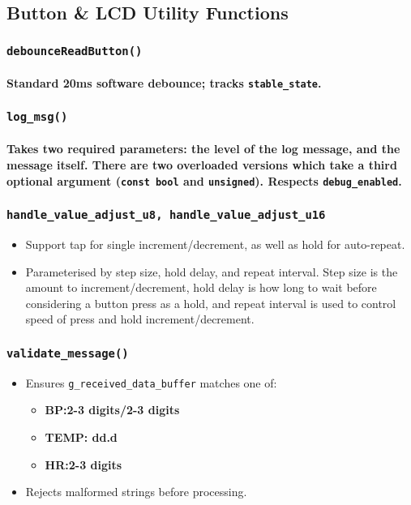 \subsection{Button \& LCD Utility Functions}
\subsubsection{\lstinline|debounceReadButton()|}
\paragraph{Standard 20ms software debounce; tracks \lstinline|stable_state|.}
\subsubsection{\lstinline|log_msg()|}
\paragraph{Takes two required parameters: the level of the log message, and the message itself. There are two overloaded versions which take a third optional argument (\lstinline|const bool| and \lstinline|unsigned|). Respects \lstinline|debug_enabled|.}
\subsubsection{\lstinline|handle_value_adjust_u8, handle_value_adjust_u16|}
\begin{itemize}
	\item Support tap for single increment/decrement, as well as hold for auto-repeat.
	\item Parameterised by step size, hold delay, and repeat interval. Step size is the amount to increment/decrement, hold delay is how long to wait before considering a button press as a hold, and repeat interval is used to control speed of press and hold increment/decrement.
	
\end{itemize}
\subsubsection{\lstinline|validate_message()|}
\begin{itemize}
	\item Ensures \lstinline|g_received_data_buffer| matches one of:
	\begin{itemize}
		\item \textbf{BP:2-3 digits/2-3 digits}
		\item \textbf{TEMP: dd.d}
		\item \textbf{HR:2-3 digits}
	\end{itemize}
	\item Rejects malformed strings before processing.
\end{itemize}

